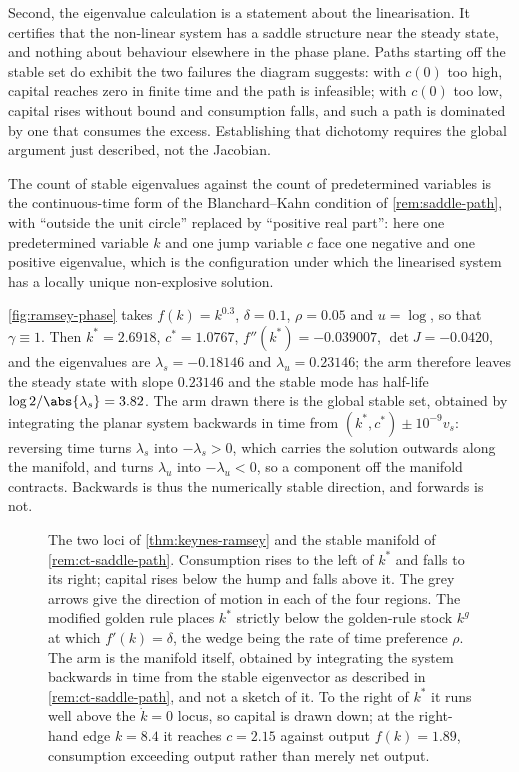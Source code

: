 \begin{remark}
	Second, the eigenvalue calculation is a statement about the linearisation. It
	certifies that the non-linear system has a saddle structure near the steady
	state, and nothing about behaviour elsewhere in the phase plane. Paths starting
	off the stable set do exhibit the two failures the diagram suggests: with $c(0)$
	too high, capital reaches zero in finite time and the path is infeasible; with
	$c(0)$ too low, capital rises without bound and consumption falls, and such a
	path is dominated by one that consumes the excess. Establishing that dichotomy
	requires the global argument just described, not the Jacobian.

	The count of stable eigenvalues against the count of predetermined variables is
	the continuous-time form of the Blanchard--Kahn condition of
	\autoref{rem:saddle-path}, with ``outside the unit circle'' replaced by
	``positive real part'': here one predetermined variable $k$ and one jump
	variable $c$ face one negative and one positive eigenvalue, which is the
	configuration under which the linearised system has a locally unique
	non-explosive solution.

	\autoref{fig:ramsey-phase} takes $f(k)=k^{0.3}$, $\delta=0.1$, $\rho=0.05$ and
	$u=\log$, so that $\gamma\equiv1$. Then $k^{\ast}=2.6918$, $c^{\ast}=1.0767$,
	$f''(k^{\ast})=-0.039007$, $\det J=-0.0420$, and the eigenvalues are
	$\lambda_{s}=-0.18146$ and $\lambda_{u}=0.23146$; the arm therefore leaves the
	steady state with slope $0.23146$ and the stable mode has half-life
	$\log2/\abs{\lambda_{s}}=3.82$. The arm drawn there is the global stable set,
	obtained by integrating the planar system backwards in time from
	$(k^{\ast},c^{\ast})\pm10^{-9}v_{s}$: reversing time turns $\lambda_{s}$ into
	$-\lambda_{s}>0$, which carries the solution outwards along the manifold, and
	turns $\lambda_{u}$ into $-\lambda_{u}<0$, so a component off the manifold
	contracts. Backwards is thus the numerically stable direction, and forwards
	is not.
\end{remark}

\begin{figure}[htbp]
	\centering
	
	\caption[Phase diagram of the Ramsey problem]{The two loci of
		\autoref{thm:keynes-ramsey} and the stable manifold of
		\autoref{rem:ct-saddle-path}. Consumption rises to the left of $k^{\ast}$
		and falls to its right; capital rises below the hump and falls above it.
		The grey arrows give the direction of motion in each of the four regions.
		The modified golden rule places $k^{\ast}$ strictly below the golden-rule
		stock $k^{g}$ at which $f'(k)=\delta$, the wedge being the rate of time
		preference $\rho$. The arm is the manifold itself, obtained by integrating
		the system backwards in time from the stable eigenvector as described in
		\autoref{rem:ct-saddle-path}, and not a sketch of it. To the right of
		$k^{\ast}$ it runs well above the $\dot k=0$ locus, so capital is drawn
		down; at the right-hand edge $k=8.4$ it reaches $c=2.15$ against output
		$f(k)=1.89$, consumption exceeding output rather than merely net output.}
	\label{fig:ramsey-phase}
\end{figure}

